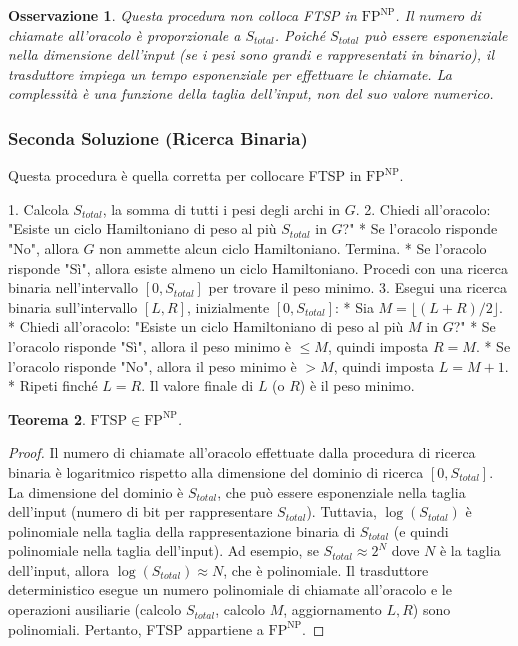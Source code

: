 \documentclass[a4paper, 11pt]{book} %
\newtheorem{theorem}{Teorema}[section]
\newtheorem{remark}[theorem]{Osservazione}
\theoremstyle{definition}
\begin{document}
\begin{remark}
Questa procedura non colloca FTSP in $\text{FP}^{\text{NP}}$. Il numero di chiamate all'oracolo è proporzionale a $S_{total}$. Poiché $S_{total}$ può essere esponenziale nella dimensione dell'input (se i pesi sono grandi e rappresentati in binario), il trasduttore impiega un tempo esponenziale per effettuare le chiamate. La complessità è una funzione della taglia dell'input, non del suo valore numerico.
\end{remark}

\subsubsection{Seconda Soluzione (Ricerca Binaria)}
Questa procedura è quella corretta per collocare FTSP in $\text{FP}^{\text{NP}}$.

1.  Calcola $S_{total}$, la somma di tutti i pesi degli archi in $G$.
2.  Chiedi all'oracolo: "Esiste un ciclo Hamiltoniano di peso al più $S_{total}$ in $G$?"
    *   Se l'oracolo risponde "No", allora $G$ non ammette alcun ciclo Hamiltoniano. Termina.
    *   Se l'oracolo risponde "Sì", allora esiste almeno un ciclo Hamiltoniano. Procedi con una ricerca binaria nell'intervallo $[0, S_{total}]$ per trovare il peso minimo.
3.  Esegui una ricerca binaria sull'intervallo $[L, R]$, inizialmente $[0, S_{total}]$:
    *   Sia $M = \lfloor (L+R)/2 \rfloor$.
    *   Chiedi all'oracolo: "Esiste un ciclo Hamiltoniano di peso al più $M$ in $G$?"
    *   Se l'oracolo risponde "Sì", allora il peso minimo è $\le M$, quindi imposta $R = M$.
    *   Se l'oracolo risponde "No", allora il peso minimo è $> M$, quindi imposta $L = M+1$.
    *   Ripeti finché $L=R$. Il valore finale di $L$ (o $R$) è il peso minimo.

\begin{theorem}
$\text{FTSP} \in \text{FP}^{\text{NP}}$.
\end{theorem}
\begin{proof}
Il numero di chiamate all'oracolo effettuate dalla procedura di ricerca binaria è logaritmico rispetto alla dimensione del dominio di ricerca $[0, S_{total}]$.
La dimensione del dominio è $S_{total}$, che può essere esponenziale nella taglia dell'input (numero di bit per rappresentare $S_{total}$).
Tuttavia, $\log(S_{total})$ è polinomiale nella taglia della rappresentazione binaria di $S_{total}$ (e quindi polinomiale nella taglia dell'input).
Ad esempio, se $S_{total} \approx 2^N$ dove $N$ è la taglia dell'input, allora $\log(S_{total}) \approx N$, che è polinomiale.
Il trasduttore deterministico esegue un numero polinomiale di chiamate all'oracolo e le operazioni ausiliarie (calcolo $S_{total}$, calcolo $M$, aggiornamento $L, R$) sono polinomiali. Pertanto, FTSP appartiene a $\text{FP}^{\text{NP}}$.
\end{proof}
\end{document}

